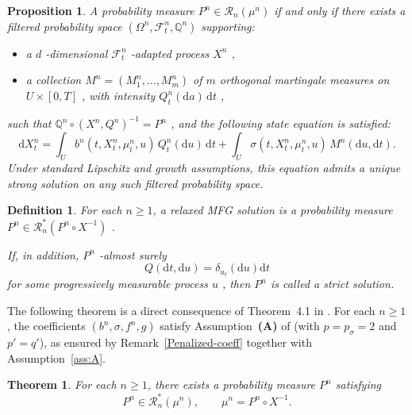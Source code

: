 \documentclass[11pt,amsfonts]{article}
\theoremstyle{plain}
\newtheorem{definition}{Definition}
\newtheorem{theorem}{Theorem}
\newtheorem{proposition}{Proposition}
\theoremstyle{assumpstyle}
\numberwithin{equation}{section}
\numberwithin{theorem}{section}
\numberwithin{proposition}{section}
\numberwithin{definition}{section}
\numberwithin{remark}{section}
\numberwithin{corollary}{section}
\numberwithin{lemma}{section}
\begin{document}
\begin{proposition}\label{rep martingale for nMFG}
A probability measure $  P^n \in \mathcal{R}_n(\mu^n) $  if and only if there exists a filtered probability space $  (\Omega^n, \mathcal{F}^n_t, \mathbb{Q}^n) $  supporting:
\begin{itemize}
    \item a $  d $ -dimensional $  \mathcal{F}^n_t $ -adapted process $  X^n $ ,
    \item a collection $  M^n = (M^n_1, \ldots, M^n_m) $  of $  m $  orthogonal martingale measures on $ U \times [0, T] $ , with intensity $  Q^n_t(\mathrm{d}a)\,\mathrm{d}t $ ,
\end{itemize}
such that $  \mathbb{Q}^n \circ (X^n, Q^n)^{-1} = P^n $ , and the following state equation is satisfied:
\begin{equation*}
\mathrm{d}X_t^n = \int_U b^n(t, X_t^n, \mu^n_t, u)\, Q_t^n(\mathrm{d}u)\, \mathrm{d}t + \int_U \sigma(t, X_t^n, \mu^n_t, u)\, M^n(\mathrm{d}u, \mathrm{d}t).
\end{equation*}
Under standard Lipschitz and growth assumptions, this equation admits a unique strong solution on any such filtered probability space.
\end{proposition}

\begin{definition}
For each $  n \geq 1$, a relaxed MFG solution is a probability measure $  P^n \in \mathcal{R}_n^*(P^n \circ X^{-1}) $ .

If, in addition, $  P^n $ -almost surely
\begin{equation*}
Q(\mathrm{d}t, \mathrm{d}u) = \delta_{u_t}(\mathrm{d}u)\mathrm{d}t
\end{equation*}
for some progressively measurable process $  u $ , then $  P^n $  is called a strict solution.
\end{definition}

The following theorem is a direct consequence of Theorem~4.1 in \cite{laker}. 
For each $n \geq 1$, the coefficients $(b^n, \sigma, f^n, g)$ satisfy Assumption~\textbf{(A)} of \cite{laker} (with $p = p_{\sigma} = 2$ and $p' = q'$), as ensured by Remark~\ref{Penalized-coeff} together with Assumption~\ref{ass:A}.

\begin{theorem}\label{MFG-existence for penalization}
For each $n \geq 1$, there exists a probability measure $P^n$ satisfying
\begin{equation*}
P^n \in \mathcal{R}_n^*(\mu^n),
\qquad 
\mu^n = P^n \circ X^{-1}.
\end{equation*}
\end{theorem}
\end{document}
